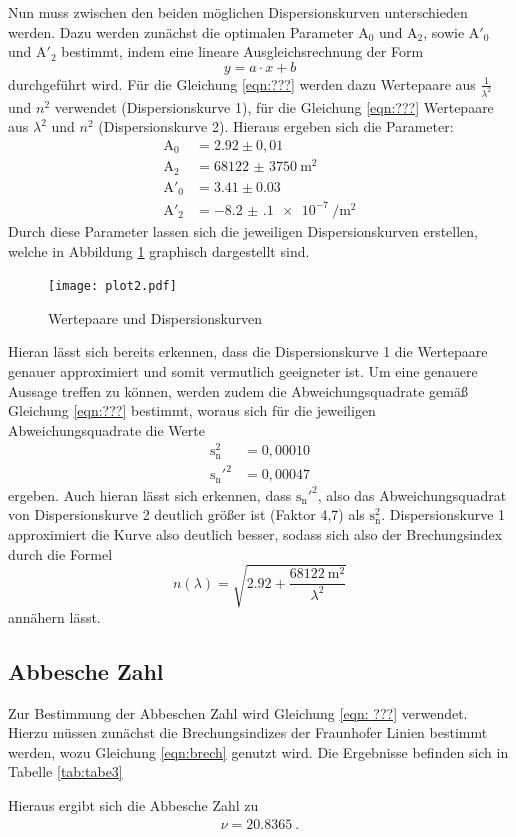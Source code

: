 Nun muss zwischen den beiden möglichen Dispersionskurven unterschieden werden.
Dazu werden zunächst die optimalen Parameter $\text{A}_0$ und $\text{A}_2$, sowie
$\text{A}'_0$ und $\text{A}'_2$
bestimmt, indem eine lineare Ausgleichsrechnung der Form
\begin{equation}
  y = a\cdot x +b
  \label{eqn:linear}
\end{equation}
durchgeführt wird. Für die Gleichung \ref{eqn:???} werden dazu Wertepaare aus $\frac{1}{\lambda^2}$
und $n^2$ verwendet (Dispersionskurve 1), für die Gleichung \ref{eqn:???} Wertepaare aus $\lambda^2$
und $n^2$ (Dispersionskurve 2).
Hieraus ergeben sich die Parameter:
\begin{align*}
  \text{A}_0 &= 2.92 \pm 0,01 \\
  \text{A}_2 &= \SI{68122(3750)}{\meter\squared} \\
  \text{A}'_0 &= 3.41 \pm 0.03 \\
  \text{A}'_2 &= \SI{-8.2(1)e-7}{\per\meter\squared}
\end{align*}
Durch diese Parameter lassen sich die jeweiligen Dispersionskurven erstellen, welche in Abbildung
\ref{fig:plot2} graphisch dargestellt sind.
\begin{figure}[H]
  \centering
  \texttt{[image: plot2.pdf]}
  \caption{Wertepaare und Dispersionskurven}
  \label{fig:plot2}
\end{figure}
Hieran lässt sich bereits erkennen, dass die Dispersionskurve 1 die Wertepaare genauer
approximiert und somit vermutlich geeigneter ist.
Um eine genauere Aussage treffen zu können, werden zudem die Abweichungsquadrate gemäß
Gleichung \ref{eqn:???} bestimmt, woraus sich für die jeweiligen Abweichungsquadrate
die Werte
\begin{align*}
  \text{s}_{\text{n}}^2 &= 0,00010 \\
  \text{s}_{\text{n}}'^2 &= 0,00047
\end{align*}
ergeben.
Auch hieran lässt sich erkennen, dass $\text{s}_{\text{n}}'^2$, also das Abweichungsquadrat
von Dispersionskurve 2 deutlich größer ist (Faktor 4,7) als $\text{s}_{\text{n}}^2$.
Dispersionskurve 1 approximiert die Kurve also deutlich besser, sodass sich also
der Brechungsindex durch die Formel
\begin{equation}
  n(\lambda) = \sqrt{2.92 + \frac{\SI{68122}{\meter\squared}}{{\lambda}^2}}
  \label{eqn:brech}
\end{equation}
annähern lässt.

\subsection{Abbesche Zahl}
Zur Bestimmung der Abbeschen Zahl wird Gleichung \ref{eqn: ???} verwendet.
Hierzu müssen zunächst die Brechungsindizes der Fraunhofer Linien bestimmt werden,
wozu Gleichung \ref{eqn:brech} genutzt wird. Die Ergebnisse befinden sich in Tabelle
\ref{tab:tabe3}

Hieraus ergibt sich die Abbesche Zahl zu
\begin{align}
  \nu = 20.8365 \: .
\end{align}

